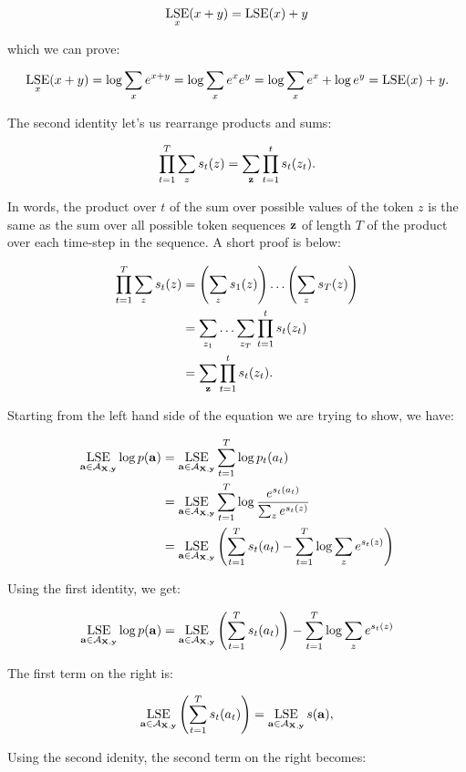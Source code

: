 $$
\operatorname*{\textrm{LSE}}_x( x + y) = \operatorname*{\textrm{LSE}}(x) + y
$$

which we can prove:

$$
\operatorname*{\textrm{LSE}}_x (x + y) = \log \sum_x e^{x+y} = \log \sum_x e^x e^y = \log \sum_x e^x + \log e^y = \operatorname*{\textrm{LSE}}(x) + y.
$$

The second identity let's us rearrange products and sums:

$$
\prod_{t=1}^T \sum_{z} s_t(z) = \sum_{\bf z} \prod_{t=1}^t s_t(z_t).
$$

In words, the product over $t$ of the sum over possible values of the token $z$
is the same as the sum over all possible token sequences ${\bf z}$ of length $T$ of
the product over each time-step in the sequence. A short proof is below:

\begin{align*}
\prod_{t=1}^T \sum_{z} s_t(z) &= \left(\sum_{z} s_1(z)\right) \ldots \left(\sum_{z} s_T(z)\right) \\
&= \sum_{z_1} \ldots \sum_{z_T} \prod_{t=1}^t s_t(z_t) \\
&= \sum_{{\bf z}}\prod_{t=1}^t s_t(z_t).
\end{align*}

Starting from the left hand side of the equation we are trying to show, we have:

\begin{align*}
\operatorname*{\textrm{LSE}}_{{\bf a} \in \mathcal{A}_{{\bf X}, {\bf y}}} \log p({\bf a}) &= \operatorname*{\textrm{LSE}}_{{\bf a} \in \mathcal{A}_{{\bf X}, {\bf y}}} \sum_{t=1}^T \log p_t(a_t) \\
&= \operatorname*{\textrm{LSE}}_{{\bf a} \in \mathcal{A}_{{\bf X}, {\bf y}}} \sum_{t=1}^T \log \frac{e^{s_t(a_t)}}{\sum_z e^{s_t(z)}} \\
&= \operatorname*{\textrm{LSE}}_{{\bf a} \in \mathcal{A}_{{\bf X}, {\bf y}}} \left( \sum_{t=1}^T s_t(a_t) - \sum_{t=1}^T \log \sum_z e^{s_t(z)} \right)\\
\end{align*}

Using the first identity, we get:

\begin{align*}
\operatorname*{\textrm{LSE}}_{{\bf a} \in \mathcal{A}_{{\bf X}, {\bf y}}} \log p({\bf a}) &= \operatorname*{\textrm{LSE}}_{{\bf a} \in \mathcal{A}_{{\bf X}, {\bf y}}} \left( \sum_{t=1}^T s_t(a_t)\right) - \sum_{t=1}^T \log \sum_z e^{s_t(z)} \\
\end{align*}

The first term on the right is:

$$
\operatorname*{\textrm{LSE}}_{{\bf a} \in \mathcal{A}_{{\bf X}, {\bf y}}} \left( \sum_{t=1}^T s_t(a_t)\right) = \operatorname*{\textrm{LSE}}_{{\bf a} \in \mathcal{A}_{{\bf X}, {\bf y}}} s({\bf a}),
$$

Using the second idenity, the second term on the right becomes:


